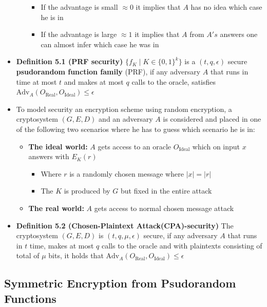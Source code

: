 \begin{itemize}
\begin{itemize}
\begin{itemize}
      \item If the advantage is small $\approx 0$ it implies that $A$ has no idea which case he is in
      \item If the advantage is large $\approx 1$ it implies that $A$ from $A's$ answers one can almost infer which case he was in
    \end{itemize}
  \end{itemize}
  \item \textbf{Definition 5.1 (PRF security)} $\{f_K \mid K \in \{0,1\}^k\}$ is a $(t,q, \epsilon)$ secure \textbf{psudorandom function family} (PRF), if any adversary $A$ that runs in time at most $t$ and makes at most $q$ calls to the oracle, satisfies $\text{Adv}_A(O_\text{Real}, O_\text{Ideal}) \leq \epsilon$

  \item To model security an encryption scheme using random encryption, a cryptosystem $(G,E,D)$ and an adversary $A$ is considered and placed in one of the following two scenarios where he has to guess which scenario he is in:
  \begin{itemize}
  	\item \textbf{The ideal world:} $A$ gets access to an oracle $O_\text{Ideal}$ which on input $x$ answers with $E_K(r)$
    \begin{itemize}
  		\item Where $r$ is a randomly chosen message where $|x| = |r|$
  		\item The $K$ is produced by $G$ but fixed in the entire attack
    \end{itemize}
  	\item \textbf{The real world:} $A$ gets access to normal chosen message attack
  \end{itemize}
  \item \textbf{Definition 5.2 (Chosen-Plaintext Attack(CPA)-security)} The cryptosystem $(G,E,D)$ is $(t,q, \mu, \epsilon)$ secure, if any adversary $A$ that runs in $t$ time, makes at most $q$ calls to the oracle and with plaintexts consisting of total of $\mu$ bits, it holds that $\text{Adv}_A(O_\text{Real}, O_\text{Ideal}) \leq \epsilon$
\end{itemize}

\subsection{Symmetric Encryption from Psudorandom Functions}
